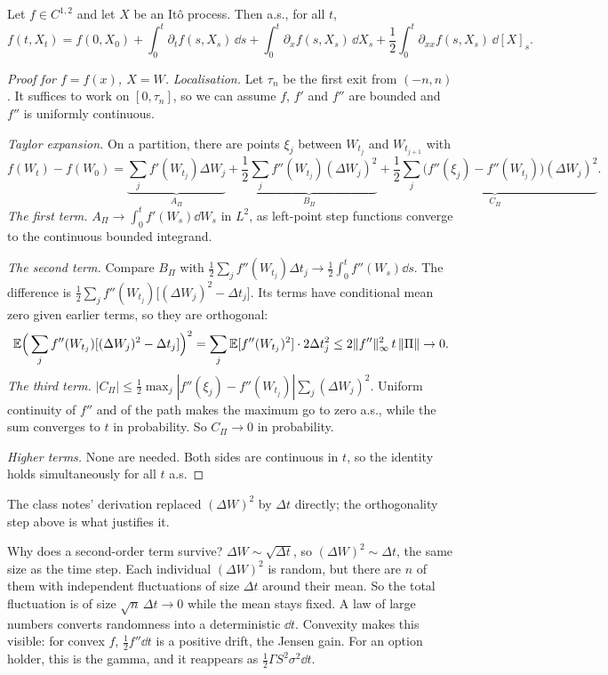 \begin{theorem}[It\^o--Doeblin]\label{thm:ito}
Let $f\in C^{1,2}$ and let $X$ be an It\^o process. Then a.s., for all $t$,
\[
f(t,X_t)=f(0,X_0)+\int_0^t\partial_tf(s,X_s)\,\dd s+\int_0^t\partial_xf(s,X_s)\,\dd X_s+\frac12\int_0^t\partial_{xx}f(s,X_s)\,\dd[X]_s.
\]
\end{theorem}
\begin{proof}[Proof for $f=f(x)$, $X=W$]
\emph{Localisation.} Let $\tau_n$ be the first exit from $(-n,n)$. It suffices to work on $[0,\tau_n]$, so we can assume $f$, $f'$ and $f''$ are bounded and $f''$ is uniformly continuous.

\emph{Taylor expansion.} On a partition, there are points $\xi_j$ between $W_{t_j}$ and $W_{t_{j+1}}$ with
\[
f(W_t)-f(W_0)=\underbrace{\sum_jf'(W_{t_j})\Delta W_j}_{A_\Pi}+\underbrace{\frac12\sum_jf''(W_{t_j})(\Delta W_j)^2}_{B_\Pi}+\underbrace{\frac12\sum_j\bigl(f''(\xi_j)-f''(W_{t_j})\bigr)(\Delta W_j)^2}_{C_\Pi}.
\]
\emph{The first term.} $A_\Pi\to\int_0^tf'(W_s)\dd W_s$ in $L^2$, as left-point step functions converge to the continuous bounded integrand.

\emph{The second term.} Compare $B_\Pi$ with $\tfrac12\sum_jf''(W_{t_j})\Delta t_j\to\tfrac12\int_0^tf''(W_s)\dd s$. The difference is $\tfrac12\sum_jf''(W_{t_j})\bigl[(\Delta W_j)^2-\Delta t_j\bigr]$. Its terms have conditional mean zero given earlier terms, so they are orthogonal:
\[
\mathbb{E}\Big(\sum_jf''(W_{t_j})[(\Delta W_j)^2-\Delta t_j]\Big)^2=\sum_j\mathbb{E}[f''(W_{t_j})^2]\cdot2\Delta t_j^2\le2\|f''\|_\infty^2\,t\,\|\Pi\|\to0.
\]
\emph{The third term.} $|C_\Pi|\le\frac12\max_j|f''(\xi_j)-f''(W_{t_j})|\sum_j(\Delta W_j)^2$. Uniform continuity of $f''$ and of the path makes the maximum go to zero a.s., while the sum converges to $t$ in probability. So $C_\Pi\to0$ in probability.

\emph{Higher terms.} None are needed. Both sides are continuous in $t$, so the identity holds simultaneously for all $t$ a.s.
\end{proof}

The class notes' derivation replaced $(\Delta W)^2$ by $\Delta t$ directly; the orthogonality step above is what justifies it.

\begin{intuition}
Why does a second-order term survive? $\Delta W\sim\sqrt{\Delta t}$, so $(\Delta W)^2\sim\Delta t$, the same size as the time step. Each individual $(\Delta W)^2$ is random, but there are $n$ of them with independent fluctuations of size $\Delta t$ around their mean. So the total fluctuation is of size $\sqrt n\,\Delta t\to0$ while the mean stays fixed. A law of large numbers converts randomness into a deterministic $\dd t$. Convexity makes this visible: for convex $f$, $\tfrac12f''\dd t$ is a positive drift, the Jensen gain. For an option holder, this is the gamma, and it reappears as $\tfrac12\Gamma S^2\sigma^2\dd t$.
\end{intuition}

